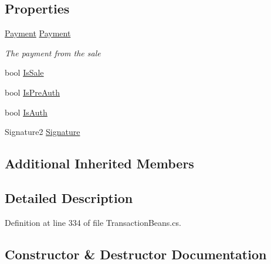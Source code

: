 \subsection*{Properties}
\begin{DoxyCompactItemize}
\item 
\hyperlink{classcom_1_1clover_1_1sdk_1_1v3_1_1payments_1_1_payment}{Payment} \hyperlink{classcom_1_1clover_1_1remotepay_1_1sdk_1_1_payment_response_a6a08d55412ab1aec30c30fe0262ffb9c}{Payment}
\begin{DoxyCompactList}\small\item\em The payment from the sale \end{DoxyCompactList}\item 
bool \hyperlink{classcom_1_1clover_1_1remotepay_1_1sdk_1_1_payment_response_abcab1ec38c7b407f3426054abf39d581}{Is\+Sale}
\item 
bool \hyperlink{classcom_1_1clover_1_1remotepay_1_1sdk_1_1_payment_response_a1bb5961682a7274009315c6f7322f057}{Is\+Pre\+Auth}
\item 
bool \hyperlink{classcom_1_1clover_1_1remotepay_1_1sdk_1_1_payment_response_af7e32b0eb6bc49c8cff5d4e5ef5d2889}{Is\+Auth}
\item 
Signature2 \hyperlink{classcom_1_1clover_1_1remotepay_1_1sdk_1_1_payment_response_aa0cb7dcf8ea0525b02afe84eae8220d0}{Signature}
\end{DoxyCompactItemize}
\subsection*{Additional Inherited Members}


\subsection{Detailed Description}


Definition at line 334 of file Transaction\+Beans.\+cs.



\subsection{Constructor \& Destructor Documentation}
\mbox{\label{classcom_1_1clover_1_1remotepay_1_1sdk_1_1_payment_response_a78b60aba6e82269bc92535d36bbb0c8c}} 
